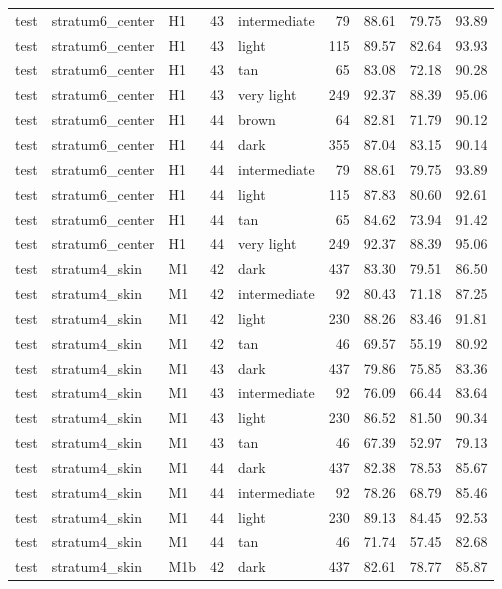 \begin{tabular}{lllrlrrrr}
test & stratum6\_center & H1 & 43 & intermediate & 79 & 88.61 & 79.75 & 93.89 \\
test & stratum6\_center & H1 & 43 & light & 115 & 89.57 & 82.64 & 93.93 \\
test & stratum6\_center & H1 & 43 & tan & 65 & 83.08 & 72.18 & 90.28 \\
test & stratum6\_center & H1 & 43 & very light & 249 & 92.37 & 88.39 & 95.06 \\
test & stratum6\_center & H1 & 44 & brown & 64 & 82.81 & 71.79 & 90.12 \\
test & stratum6\_center & H1 & 44 & dark & 355 & 87.04 & 83.15 & 90.14 \\
test & stratum6\_center & H1 & 44 & intermediate & 79 & 88.61 & 79.75 & 93.89 \\
test & stratum6\_center & H1 & 44 & light & 115 & 87.83 & 80.60 & 92.61 \\
test & stratum6\_center & H1 & 44 & tan & 65 & 84.62 & 73.94 & 91.42 \\
test & stratum6\_center & H1 & 44 & very light & 249 & 92.37 & 88.39 & 95.06 \\
test & stratum4\_skin & M1 & 42 & dark & 437 & 83.30 & 79.51 & 86.50 \\
test & stratum4\_skin & M1 & 42 & intermediate & 92 & 80.43 & 71.18 & 87.25 \\
test & stratum4\_skin & M1 & 42 & light & 230 & 88.26 & 83.46 & 91.81 \\
test & stratum4\_skin & M1 & 42 & tan & 46 & 69.57 & 55.19 & 80.92 \\
test & stratum4\_skin & M1 & 43 & dark & 437 & 79.86 & 75.85 & 83.36 \\
test & stratum4\_skin & M1 & 43 & intermediate & 92 & 76.09 & 66.44 & 83.64 \\
test & stratum4\_skin & M1 & 43 & light & 230 & 86.52 & 81.50 & 90.34 \\
test & stratum4\_skin & M1 & 43 & tan & 46 & 67.39 & 52.97 & 79.13 \\
test & stratum4\_skin & M1 & 44 & dark & 437 & 82.38 & 78.53 & 85.67 \\
test & stratum4\_skin & M1 & 44 & intermediate & 92 & 78.26 & 68.79 & 85.46 \\
test & stratum4\_skin & M1 & 44 & light & 230 & 89.13 & 84.45 & 92.53 \\
test & stratum4\_skin & M1 & 44 & tan & 46 & 71.74 & 57.45 & 82.68 \\
test & stratum4\_skin & M1b & 42 & dark & 437 & 82.61 & 78.77 & 85.87 \\

\end{tabular}
